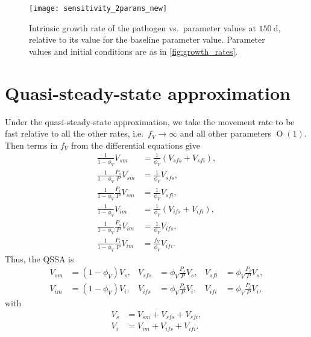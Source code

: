 \documentclass{article}
\begin{document}
\begin{figure}
  \centering
  \texttt{[image: sensitivity\_2params\_new]}
  \caption{Intrinsic growth rate of the pathogen vs.~parameter values
    at $150~\text{d}$, relative to its value for the baseline
    parameter value.  Parameter values and
    initial conditions are as in \autoref{fig:growth_rates}.}
  \label{fig:sensitivity_2params}
\end{figure}


\clearpage
\appendix
\section{Quasi-steady-state approximation}
\label{sec:QSSA}

Under the quasi-steady-state approximation, we take the movement rate
to be fast relative to all the other rates, i.e.~$f_V \to \infty$ and
all other parameters $\operatorname{O}(1)$.  Then terms in $f_V$ from
the differential equations give
\begin{equation}
  \begin{split}
    \frac{1}{1 - \phi_V} V_{sm} &= \frac{1}{\phi_V} (V_{sfs} + V_{sfi}),
    \\
    \frac{1}{1 - \phi_V} \frac{P_s}{P} V_{sm} &= \frac{1}{\phi_V} V_{sfs},
    \\
    \frac{1}{1 - \phi_V} \frac{P_i}{P} V_{sm} &= \frac{1}{\phi_V} V_{sfi},
    \\
    \frac{1}{1 - \phi_V} V_{im} &= \frac{1}{\phi_V} (V_{ifs} + V_{ifi}),
    \\
    \frac{1}{1 - \phi_V} \frac{P_s}{P} V_{im} &= \frac{1}{\phi_V} V_{ifs},
    \\
    \frac{1}{1 - \phi_V} \frac{P_i}{P} V_{im} &= \frac{f_V}{\phi_V} V_{ifi}.
  \end{split}
\end{equation}
Thus, the QSSA is
\begin{equation}
  \begin{aligned}
    V_{sm} &= (1 - \phi_V) V_s,
    &
    V_{sfs} &= \phi_V \frac{P_s}{P} V_s,
    &
    V_{sfi} &= \phi_V \frac{P_i}{P} V_s,
    \\
    V_{im} &= (1 - \phi_V) V_i,
    &
    V_{ifs} &= \phi_V \frac{P_s}{P} V_i,
    &
    V_{ifi} &= \phi_V \frac{P_i}{P} V_i,
  \end{aligned}
\end{equation}
with
\begin{equation}
  \begin{split}
    V_s &= V_{sm} + V_{sfs} + V_{sfi}, \\
    V_i &= V_{im} + V_{ifs} + V_{ifi}.
  \end{split}
\end{equation}
\end{document}

